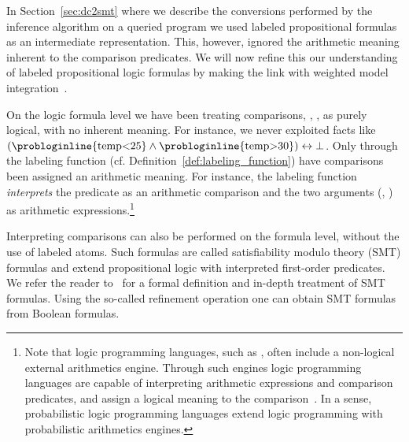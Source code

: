 
In Section~\ref{sec:dc2smt} where we describe the conversions performed by the inference algorithm on a queried \dcproblogsty program we used labeled propositional formulas as an intermediate representation. This, however, ignored the arithmetic meaning inherent to the comparison predicates. We will now refine this our understanding of labeled propositional logic formulas by making the link with weighted model integration~\citep{belle2015probabilistic}.

On the logic formula level we have been treating comparisons, \eg, , as purely logical, with no inherent meaning. For instance, we never exploited facts like $(\text{\probloginline{temp<25}} \land \text{\probloginline{temp>30}}) \leftrightarrow \bot $. Only through the labeling function (cf. Definition~\ref{def:labeling_function}) have comparisons been assigned an arithmetic meaning. For instance, the labeling function {\em interprets} the predicate  as an arithmetic comparison and the two arguments (, ) as arithmetic expressions.\footnote{Note that logic programming languages, such as \problogsty, often include a non-logical external arithmetics engine. Through such engines logic programming languages are capable of interpreting arithmetic expressions and comparison predicates, \eg {} and assign a logical meaning to the comparison~\citep[Section 8]{sterling1994art}. In a sense, probabilistic logic programming languages extend logic programming with probabilistic arithmetics engines.}

Interpreting comparisons can also be performed on the formula level, without the use of labeled atoms. Such formulas are called satisfiability modulo theory (SMT) formulas and extend propositional logic with interpreted first-order predicates. 
We refer the reader to~\citet{barrett2009handbook} for a formal definition and in-depth treatment of SMT formulas.
Using the so-called refinement operation one can obtain SMT formulas from Boolean formulas.

